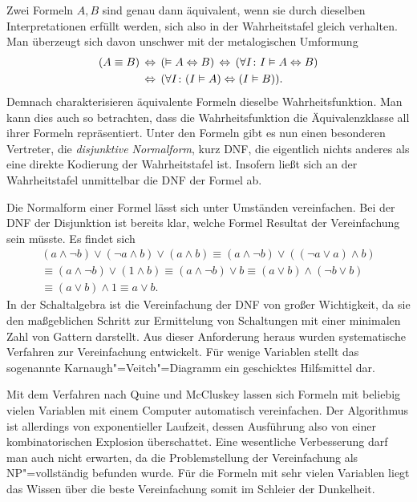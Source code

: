 Zwei Formeln $A,B$ sind genau dann äquivalent, wenn sie durch dieselben
Interpretationen erfüllt werden, sich also in der Wahrheitstafel gleich
verhalten. Man überzeugt sich davon unschwer mit der metalogischen
Umformung%
\begin{align*}
(A\equiv B) &\,\Leftrightarrow\, (\vDash A\Leftrightarrow B)
\,\Leftrightarrow\, (\forall I\colon I\vDash A\Leftrightarrow B)\\
&\,\Leftrightarrow\, (\forall I\colon (I\vDash A)\Leftrightarrow (I\vDash B)).
\end{align*}
Demnach charakterisieren äquivalente Formeln dieselbe
Wahrheitsfunktion. Man kann dies auch so betrachten, dass die
Wahrheitsfunktion die Äquivalenzklasse all ihrer Formeln repräsentiert.
Unter den Formeln gibt es nun einen besonderen Vertreter, die
\emph{disjunktive Normalform}, kurz DNF,
die eigentlich nichts anderes als eine direkte Kodierung der
Wahrheitstafel ist. Insofern ließt sich an der Wahrheitstafel
unmittelbar die DNF der Formel ab.

Die Normalform einer Formel lässt sich unter Umständen
vereinfachen. Bei der DNF der Disjunktion ist bereits klar, welche
Formel Resultat der Vereinfachung sein müsste. Es findet sich
\begin{gather*}
(a\land\lnot b)\lor (\lnot a\land b)\lor (a\land b)
\equiv (a\land\lnot b)\lor ((\lnot a\lor a)\land b)\\
\equiv (a\land\lnot b)\lor (1\land b)
\equiv (a\land\lnot b)\lor b
\equiv (a\lor b)\land (\lnot b\lor b)\\
\equiv (a\lor b)\land 1 \equiv a\lor b.
\end{gather*}
In der Schaltalgebra ist die Vereinfachung der DNF von großer
Wichtigkeit, da sie den maßgeblichen Schritt zur Ermittelung von
Schaltungen mit einer minimalen Zahl von Gattern darstellt.
Aus dieser Anforderung heraus wurden systematische Verfahren
zur Vereinfachung entwickelt. Für wenige Variablen stellt das
sogenannte Karnaugh"=Veitch"=Diagramm ein geschicktes
Hilfsmittel dar.

Mit dem Verfahren nach Quine und McCluskey lassen sich Formeln mit
beliebig vielen Variablen mit einem Computer automatisch vereinfachen.
Der Algorithmus ist allerdings von exponentieller Laufzeit, dessen
Ausführung also von einer kombinatorischen Explosion
überschattet. Eine wesentliche Verbesserung darf man auch nicht erwarten,
da die Problemstellung der Vereinfachung als NP"=vollständig befunden
wurde. Für die Formeln mit sehr vielen Variablen liegt das Wissen über
die beste Vereinfachung somit im Schleier der Dunkelheit.


